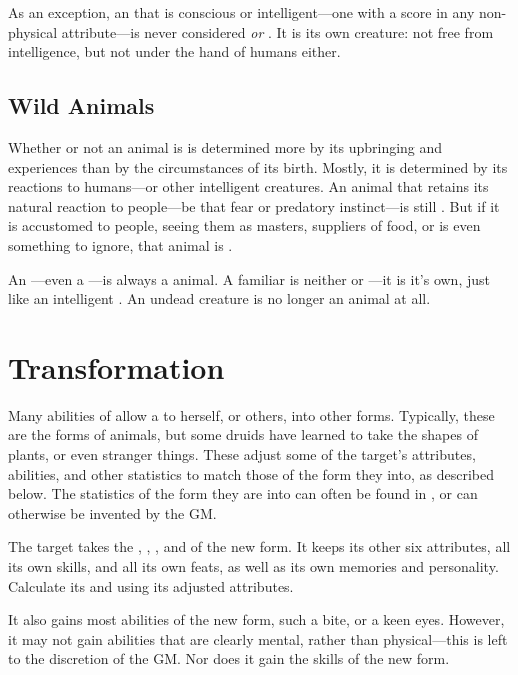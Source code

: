 As an exception, an  that is conscious or intelligent---one with a score in any non-physical attribute---is never considered {\wild} \emph{or} {\nonwild}.
It is its own creature: not free from intelligence, but not under the hand of humans either.

\subsection{Wild Animals}

Whether or not an animal is {\wild} is determined more by its upbringing and experiences than by the circumstances of its birth.
Mostly, it is determined by its reactions to humans---or other intelligent creatures.
An animal that retains its natural reaction to people---be that fear or predatory instinct---is still {\wild}.
But if it is accustomed to people, seeing them as masters, suppliers of food, or is even something to ignore, that animal is {\nonwild}.

An ---even a ---is always a {\nonwild} animal.
A familiar is neither {\wild} or {\nonwild}---it is it's own, just like an intelligent .
An undead creature is no longer an animal at all.

\section{Transformation}

Many abilities of  allow a  to {\transform} herself, or others, into other forms.
Typically, these are the forms of animals, but some druids have learned to take the shapes of plants, or even stranger things.
These {\transformations} adjust some of the target's attributes, abilities, and other statistics to match those of the form they {\transform} into, as described below.
The statistics of the form they are {\transforming} into can often be found in , or can otherwise be invented by the GM.

The target takes the , , , and  of the new form.
It keeps its other six attributes, all its own skills, and all its own feats, as well as its own memories and personality.
Calculate its  and  using its adjusted attributes.

It also gains most abilities of the new form, such a  bite, or a  keen eyes.
However, it may not gain abilities that are clearly mental, rather than physical---this is left to the discretion of the GM.
Nor does it gain the skills of the new form.

